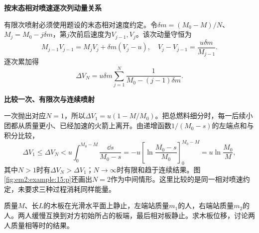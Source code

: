\begin{solution}
\par\medskip{}\noindent\textbf{按末态相对喷速逐次列动量关系}\par\nobreak
有限次喷射必须使用题设的末态相对速度约定。令$\delta m=(M_0-M)/N$、$M_j=M_0-j\delta m$，第$j$次前后速度为$V_{j-1},V_j$。该次动量守恒为
\[
M_{j-1}V_{j-1}=M_jV_j+\delta m(V_j-u),
\quad V_j-V_{j-1}=\frac{u\delta m}{M_{j-1}}.
\]
逐次累加得
\[
\Delta V_N=u\delta m\sum_{j=1}^{N}\frac1{M_0-(j-1)\delta m}.
\]


\par\medskip{}\noindent\textbf{比较一次、有限次与连续喷射}\par\nobreak
一次抛出对应$N=1$，所以$\Delta V_1=u(1-M/M_0)$。把总燃料细分时，每一后续小团都从质量更小、已经加速的火箭上离开。由递增函数$1/(M_0-s)$的左端点和与积分比较，
\[
\Delta V_1\le\Delta V_N<u\int_0^{M_0-M}\frac{\dd s}{M_0-s}
=-u\left[\ln\frac{M_0-s}{M_0}\right]_0^{M_0-M}
=u\ln\frac{M_0}{M},
\]
其中$N>1$时有$\Delta V_N>\Delta V_1$；$N\to\infty$时有限和趋于连续结果。图\ref{fig:em2:example:15:p}还画出$N=2$作为中间情形。这里比较的是同一相对喷速约定，未要求三种过程消耗同样能量。
\end{solution}
\begin{question}\begin{example}[木板上两人互换位置]\label{em2:example:16}
质量$M$、长$L$的木板在光滑水平面上静止，左端站质量$m_1$的人，右端站质量$m_2$的人。两人缓慢互换到对方初始所占的板端，最后相对板静止。求木板位移，讨论两人质量相等时的结果。
\end{example}
\end{question}
